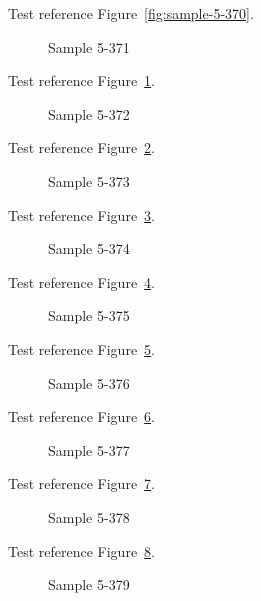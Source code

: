 Test reference Figure~\ref{fig:sample-5-370}.

\begin{figure}[tbhp]
\caption{Sample 5-371}
\label{fig:sample-5-371}
\end{figure}

Test reference Figure~\ref{fig:sample-5-371}.

\begin{figure}[tbhp]
\caption{Sample 5-372}
\label{fig:sample-5-372}
\end{figure}

Test reference Figure~\ref{fig:sample-5-372}.

\begin{figure}[tbhp]
\caption{Sample 5-373}
\label{fig:sample-5-373}
\end{figure}

Test reference Figure~\ref{fig:sample-5-373}.

\begin{figure}[tbhp]
\caption{Sample 5-374}
\label{fig:sample-5-374}
\end{figure}

Test reference Figure~\ref{fig:sample-5-374}.

\begin{figure}[tbhp]
\caption{Sample 5-375}
\label{fig:sample-5-375}
\end{figure}

Test reference Figure~\ref{fig:sample-5-375}.

\begin{figure}[tbhp]
\caption{Sample 5-376}
\label{fig:sample-5-376}
\end{figure}

Test reference Figure~\ref{fig:sample-5-376}.

\begin{figure}[tbhp]
\caption{Sample 5-377}
\label{fig:sample-5-377}
\end{figure}

Test reference Figure~\ref{fig:sample-5-377}.

\begin{figure}[tbhp]
\caption{Sample 5-378}
\label{fig:sample-5-378}
\end{figure}

Test reference Figure~\ref{fig:sample-5-378}.

\begin{figure}[tbhp]
\caption{Sample 5-379}
\label{fig:sample-5-379}
\end{figure}

